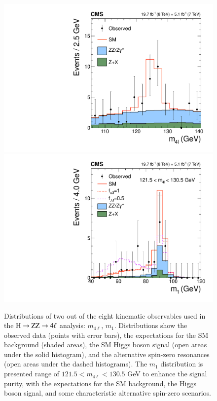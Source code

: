\begin{figure}[!htbp]
\begin{center}
\centerline{
\includegraphics[width=0.50\linewidth]{figures/cCompare_DataMC_AllTeV_ZZMass.pdf}
\includegraphics[width=0.50\linewidth]{figures/cCompare_DataMC_AllTeV_Z1Mass_SignalEnriched.pdf}
}
\caption{ Distributions of two out of the eight kinematic observables
  used in the $\mathrm{H}\to\mathrm{Z}\mathrm{Z}\to4\ell$ analysis: $m_{4\ell}$, $m_1$.  Distributions
  show the observed data (points with error bars), the expectations
  for the SM background (shaded areas), the SM Higgs boson signal
  (open areas under the solid histogram), and the alternative
  spin-zero resonances (open areas under the dashed histograms).  The
  $m_1$ distribution is presented range of $121.5 < m_{4\ell} <
  130.5$ GeV to enhance the signal purity, with the expectations for
  the SM background, the Higgs boson signal, and some characteristic
  alternative spin-zero scenarios.
\label{fig:hzzkinematics} }
\end{center}
\end{figure}

